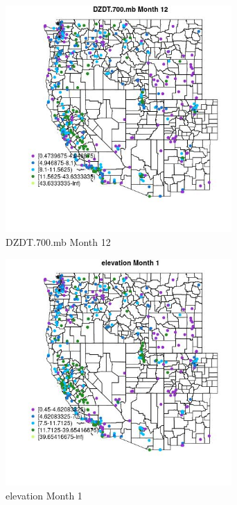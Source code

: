 \begin{figure} 
\centering  
\includegraphics[width=0.77\textwidth]{Code_Outputs/ML_input_report_ML_input_PM25_Step5_part_d_de_duplicated_aves_ML_input_MapObsMo12DZDT700mb.jpg} 
\caption{\label{fig:ML_input_report_ML_input_PM25_Step5_part_d_de_duplicated_aves_ML_inputMapObsMo12DZDT700mb}DZDT.700.mb Month 12} 
\end{figure} 
 

\begin{figure} 
\centering  
\includegraphics[width=0.77\textwidth]{Code_Outputs/ML_input_report_ML_input_PM25_Step5_part_d_de_duplicated_aves_ML_input_MapObsMo1elevation.jpg} 
\caption{\label{fig:ML_input_report_ML_input_PM25_Step5_part_d_de_duplicated_aves_ML_inputMapObsMo1elevation}elevation Month 1} 
\end{figure} 
 

